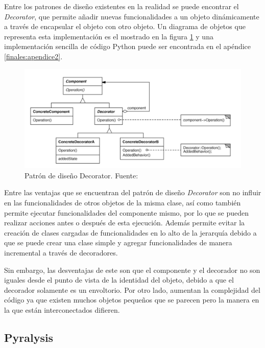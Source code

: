 Entre los patrones de diseño existentes en la realidad se puede encontrar el \textit{Decorator}, que permite añadir nuevas funcionalidades a un objeto dinámicamente a través de encapsular el objeto con otro objeto. Un diagrama de objetos que representa esta implementación es el mostrado en la figura \ref{fig:gamma2002patrones} y una implementación sencilla de código Python puede ser encontrada en el apéndice \ref{finales:apendice2}.

\begin{figure}[!ht]
	\centering
	\captionsetup{justification=centering}
	\includegraphics[scale=0.3]{images/decorator.png}
	\caption[Patrón de diseño Decorator.]{Patrón de diseño Decorator. Fuente: \citep{gamma2002patrones}}
	\label{fig:gamma2002patrones}
\end{figure}

Entre las ventajas que se encuentran del patrón de diseño \textit{Decorator} son no influir en las funcionalidades de otros objetos de la misma clase, así como también permite ejecutar funcionalidades del componente mismo, por lo que se pueden realizar acciones antes o después de esta ejecución. Además permite evitar la creación de clases cargadas de funcionalidades en lo alto de la jerarquía debido a que se puede crear una clase simple y agregar funcionalidades de manera incremental a través de decoradores. 

Sin embargo, las desventajas de este son que el componente y el decorador no son iguales desde el punto de vista de la identidad del objeto, debido a que el decorador solamente es un envoltorio. Por otro lado, aumentan la complejidad del código ya que existen muchos objetos pequeños que se parecen pero la manera en la que están interconectados difieren. 


\subsection{Pyralysis}
\label{subsec:pyralysis}

